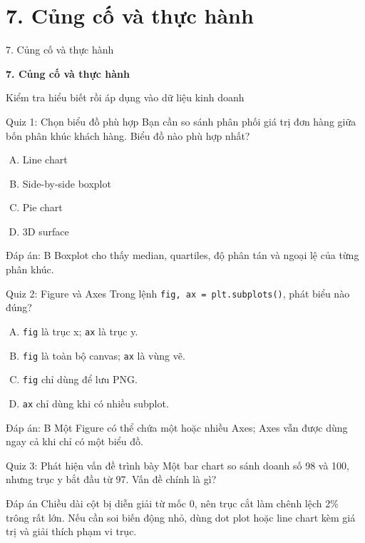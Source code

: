 \documentclass[aspectratio=169,12pt]{beamer}
\newcommand{\SectionSlide}[2]{
\section{#1}
\begin{frame}{#1}
  \vfill
  \centering
  {\usebeamercolor[fg]{structure}\fontsize{24}{29}\selectfont\bfseries #1\par}
  \vspace{5mm}
  {\large #2\par}
  \vfill
\end{frame}}
\begin{document}
\SectionSlide{7. Củng cố và thực hành}{Kiểm tra hiểu biết rồi áp dụng vào dữ liệu kinh doanh}

\begin{frame}{Quiz 1: Chọn biểu đồ phù hợp}
Bạn cần so sánh phân phối giá trị đơn hàng giữa bốn phân khúc khách hàng. Biểu đồ nào phù hợp nhất?
\begin{enumerate}[A.]\setlength\itemsep{8pt}
  \item Line chart
  \item Side-by-side boxplot
  \item Pie chart
  \item 3D surface
\end{enumerate}
\pause
\begin{block}{Đáp án: B}
Boxplot cho thấy median, quartiles, độ phân tán và ngoại lệ của từng phân khúc.
\end{block}
\end{frame}

\begin{frame}{Quiz 2: Figure và Axes}
Trong lệnh \texttt{fig, ax = plt.subplots()}, phát biểu nào đúng?
\begin{enumerate}[A.]\setlength\itemsep{7pt}
  \item \texttt{fig} là trục x; \texttt{ax} là trục y.
  \item \texttt{fig} là toàn bộ canvas; \texttt{ax} là vùng vẽ.
  \item \texttt{fig} chỉ dùng để lưu PNG.
  \item \texttt{ax} chỉ dùng khi có nhiều subplot.
\end{enumerate}
\pause
\begin{block}{Đáp án: B}
Một Figure có thể chứa một hoặc nhiều Axes; Axes vẫn được dùng ngay cả khi chỉ có một biểu đồ.
\end{block}
\end{frame}

\begin{frame}{Quiz 3: Phát hiện vấn đề trình bày}
Một bar chart so sánh doanh số 98 và 100, nhưng trục y bắt đầu từ 97. Vấn đề chính là gì?
\pause
\begin{block}{Đáp án}
Chiều dài cột bị diễn giải từ mốc 0, nên trục cắt làm chênh lệch 2\% trông rất lớn. Nếu cần soi biến động nhỏ, dùng dot plot hoặc line chart kèm giá trị và giải thích phạm vi trục.
\end{block}
\end{frame}
\end{document}

